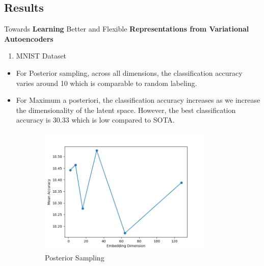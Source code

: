 \documentclass[hyperref={colorlinks,citecolor=blue,linkcolor=blue,urlcolor=blue}]{beamer}
\begin{document}
\subsection{Results}

\begin{frame}{ Towards \textbf{Learning} Better and Flexible \textbf{Representations from Variational Autoencoders} \vspace{0.3em}}
  \begin{enumerate}
    \item MNIST Dataset
  \end{enumerate}
  \begin{itemize}
    \item For Posterior sampling, across all dimensions, the classification accuracy varies around 10 which is comparable to random labeling.
    \item For Maximum a posteriori, the classification accuracy increases as we increase the dimensionality of the latent space. However, the best classification accuracy is 30.33 which is low compared to SOTA.
  \end{itemize}
  \vspace{-0.5em}
  \begin{figure}
    \begin{subfigure}[b]{0.4\textwidth}
        \centering
        \includegraphics[width=0.9\textwidth,]{./Images/MNIST_VAE_sampling.png}
        \caption{Posterior Sampling}
    \end{subfigure}
    \begin{subfigure}[b]{0.4\textwidth}
        \centering

\end{subfigure}
\end{figure}
\end{frame}
\end{document}

